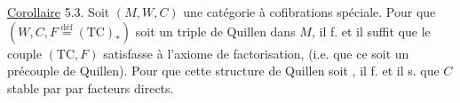 \uline{Corollaire} 5.3. Soit $(M,W,C)$ une catégorie à cofibrations spéciale. Pour que $(W,C,F\overset{\mathrm{déf}}{=}(\mathrm{TC})_*)$ soit un triple de Quillen dans $M$, il f. et il suffit que  le couple $(\mathrm{TC},F)$ satisfasse à l'axiome de factorisation, (i.e. que ce soit un précouple de Quillen). Pour que cette structure de Quillen soit , il f. et il s. que $C$   stable par par facteurs directs.
